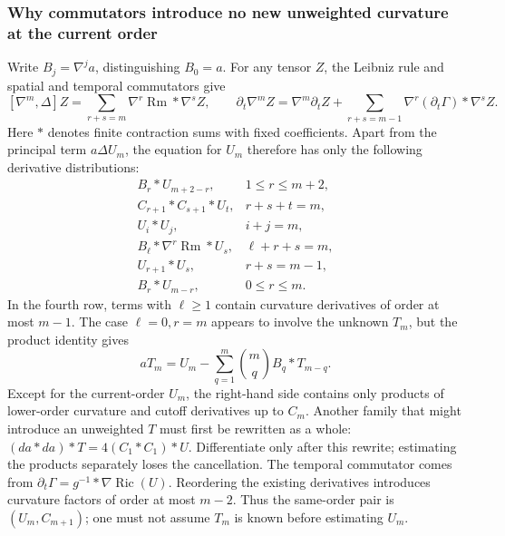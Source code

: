 \documentclass[a4paper,11pt]{article}
\numberwithin{equation}{section}
\theoremstyle{definition}
\newcommand{\Ric}{\operatorname{Ric}}
\newcommand{\Rm}{\operatorname{Rm}}
\begin{document}
\subsubsection{Why commutators introduce no new unweighted curvature at the current order}\label{sec:jet-commutators}
Write $B_j=\nabla^ja$, distinguishing $B_0=a$. For any tensor $Z$,
the Leibniz rule and spatial and temporal commutators give
\[
[\nabla^m,\Delta]Z
=\sum_{r+s=m}\nabla^r\Rm*\nabla^sZ,\qquad
\partial_t\nabla^mZ
=\nabla^m\partial_tZ+
\sum_{r+s=m-1}\nabla^r(\partial_t\Gamma)*\nabla^sZ.
\]
Here $*$ denotes finite contraction sums with fixed coefficients.
Apart from the principal term $a\Delta U_m$, the equation for $U_m$ therefore has only the following derivative distributions:
\[
\begin{array}{ll}
B_r*U_{m+2-r},&1\le r\le m+2,\\
C_{r+1}*C_{s+1}*U_t,&r+s+t=m,\\
U_i*U_j,&i+j=m,\\
B_\ell*\nabla^r\Rm*U_s,&\ell+r+s=m,\\
U_{r+1}*U_s,&r+s=m-1,\\
B_r*U_{m-r},&0\le r\le m.
\end{array}
\]
In the fourth row, terms with $\ell\ge1$ contain curvature derivatives of order at most $m-1$. The case $\ell=0,r=m$
appears to involve the unknown $T_m$, but the product identity gives
\begin{equation}\label{eq:current-curvature-elimination}
aT_m=U_m-\sum_{q=1}^m\binom mq B_q*T_{m-q}.
\end{equation}
Except for the current-order $U_m$, the right-hand side contains only products of lower-order curvature and cutoff derivatives up to $C_m$.
Another family that might introduce an unweighted $T$ must first be rewritten as a whole:
$(da*da)*T=4(C_1*C_1)*U$. Differentiate only after this rewrite; estimating the products separately loses the cancellation.
The temporal commutator comes from $\partial_t\Gamma=g^{-1}*\nabla\Ric(U)$.
Reordering the existing derivatives introduces curvature factors of order at most $m-2$.
Thus the same-order pair is $(U_m,C_{m+1})$; one must not assume $T_m$ is known before estimating $U_m$.
\end{document}

